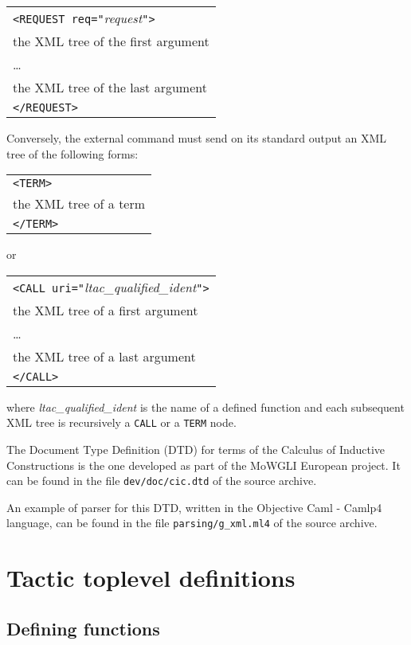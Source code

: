 \begin{tabular}{l}
\texttt{<REQUEST req="}\textsl{request}\texttt{">}\\
the XML tree of the first argument\\
{\ldots}\\
the XML tree of the last argument\\
\texttt{</REQUEST>}\\
\end{tabular}
\medskip

Conversely, the external command must send on its standard output an
XML tree of the following forms:

\medskip
\begin{tabular}{l}
\texttt{<TERM>}\\
the XML tree of a term\\
\texttt{</TERM>}\\
\end{tabular}
\medskip

\noindent or 

\medskip
\begin{tabular}{l}
\texttt{<CALL uri="}\textsl{ltac\_qualified\_ident}\texttt{">}\\
the XML tree of a first argument\\
{\ldots}\\
the XML tree of a last argument\\
\texttt{</CALL>}\\
\end{tabular}

\medskip
\noindent where \textsl{ltac\_qualified\_ident} is the name of a
defined {\ltac} function and each subsequent XML tree is recursively a
\texttt{CALL} or a \texttt{TERM} node.

The Document Type Definition (DTD) for terms of the Calculus of
Inductive Constructions is the one developed as part of the MoWGLI
European project. It can be found in the file {\tt dev/doc/cic.dtd} of
the {\Coq} source archive.

An example of parser for this DTD, written in the Objective Caml -
Camlp4 language, can be found in the file {\tt parsing/g\_xml.ml4} of
the {\Coq} source archive.

\section[Tactic toplevel definitions]{Tactic toplevel definitions}

\subsection{Defining {\ltac} functions}

